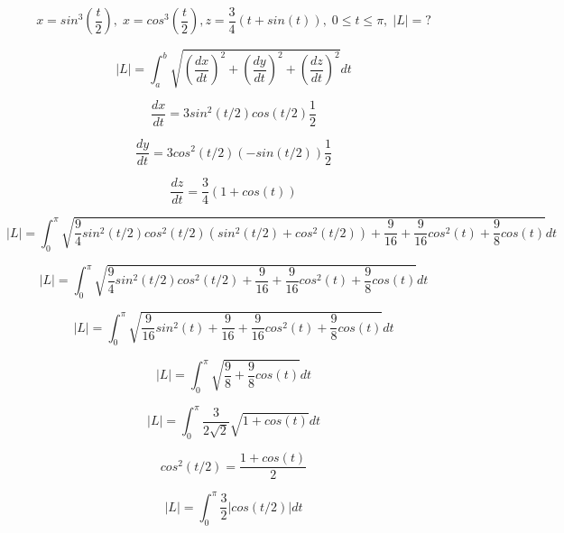 \documentclass{article}
\begin{document}
\begin{equation}
    x = sin^3(\frac{t}{2}), \; x = cos^3(\frac{t}{2}), z = \frac{3}{4}(t+sin(t)), \; 0 \leq t \leq \pi, \; |L|=?
\end{equation}

\begin{equation}
    |L| = \int_{a}^{b} \sqrt{(\frac{dx}{dt})^2+(\frac{dy}{dt})^2+(\frac{dz}{dt})^2}dt
\end{equation}

\begin{equation*}
    \frac{dx}{dt} = 3sin^2(t/2) cos(t/2) \frac{1}{2}
\end{equation*}

\begin{equation*}
    \frac{dy}{dt} = 3cos^2(t/2) (-sin(t/2)) \frac{1}{2}
\end{equation*}

\begin{equation*}
    \frac{dz}{dt} = \frac{3}{4}(1+cos(t))
\end{equation*}

\begin{equation*}
    |L| = \int_{0}^{\pi} \sqrt{\frac{9}{4} sin^2(t/2) cos^2(t/2) (sin^2(t/2)+cos^2(t/2))+\frac{9}{16}+\frac{9}{16}cos^2(t)+\frac{9}{8}cos(t)}dt
\end{equation*}

\begin{equation*}
    |L| = \int_{0}^{\pi} \sqrt{\frac{9}{4} sin^2(t/2) cos^2(t/2)+\frac{9}{16}+\frac{9}{16}cos^2(t)+\frac{9}{8}cos(t)}dt
\end{equation*}

\begin{equation*}
    |L| = \int_{0}^{\pi} \sqrt{\frac{9}{16} sin^2(t)+\frac{9}{16}+\frac{9}{16}cos^2(t)+\frac{9}{8}cos(t)}dt
\end{equation*}

\begin{equation*}
    |L| = \int_{0}^{\pi} \sqrt{\frac{9}{8}+\frac{9}{8}cos(t)}dt
\end{equation*}

\begin{equation*}
    |L| = \int_{0}^{\pi} \frac{3}{2\sqrt{2}} \sqrt{1+cos(t)}dt
\end{equation*}

\begin{equation*}
    cos^2(t/2) = \frac{1+cos(t)}{2}
\end{equation*}

\begin{equation*}
    |L| = \int_{0}^{\pi} \frac{3}{2} | cos(t/2) | dt
\end{equation*}
\end{document}
